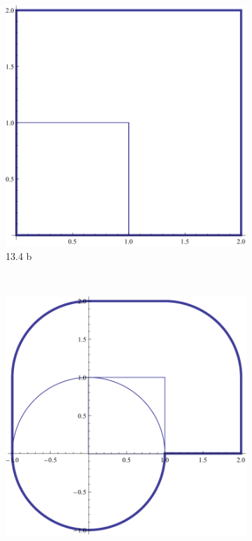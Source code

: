 \documentclass[11pt,a4paper]{article}
\begin{document}
\begin{figure}
\begin{subfigure}[b]{.4\textwidth}
        \includegraphics[width=\textwidth]{ex13-4-b.pdf}
        \caption{13.4 b}
    \end{subfigure}
    \\
    \begin{subfigure}[b]{.4\textwidth}
        \includegraphics[width=\textwidth]{ex13-4-c.pdf}

\end{subfigure}
\end{figure}
\end{document}
